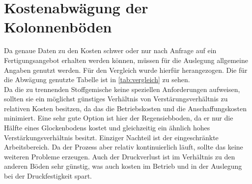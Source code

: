 \documentclass[12pt,a4paper,bibtotocnumbered,liststotocnumbered]{scrreprt}
\begin{document}
\section{Kostenabwägung der Kolonnenböden}
Da genaue Daten zu den Kosten schwer oder nur nach Anfrage auf ein Fertigungsangebot erhalten werden können, müssen für die Auslegung allgemeine Angaben genutzt werden. Für den Vergleich wurde hierfür \cite{Schoenbucher2002} herangezogen. Die für die Abwägung genutzte Tabelle ist in \autoref{tab:vergleich} zu sehen.\\
Da die zu trennenden Stoffgemische  keine speziellen Anforderungen aufweisen, sollten sie ein möglichst günstiges Verhältnis von Verstärungsverhältnis zu relativen Kosten besitzen, da das die Betriebskosten und die Anschaffungskosten minimiert. Eine sehr gute Option ist hier der Regensiebboden, da er nur die Hälfte eines Glockenbodens kostet und gleichzeitig ein ähnlich hohes Verstärkungsverhältnis besitzt. Einziger Nachteil ist der eingeschränkte Arbeitsbereich. Da der Prozess aber relativ kontinuierlich läuft, sollte das keine weiteren Probleme erzeugen. Auch der Druckverlust ist im Verhältnis zu den anderen Böden sehr günstig, was auch kosten im Betrieb und in der Auslegung bei der Druckfestigkeit spart.
\end{document}
